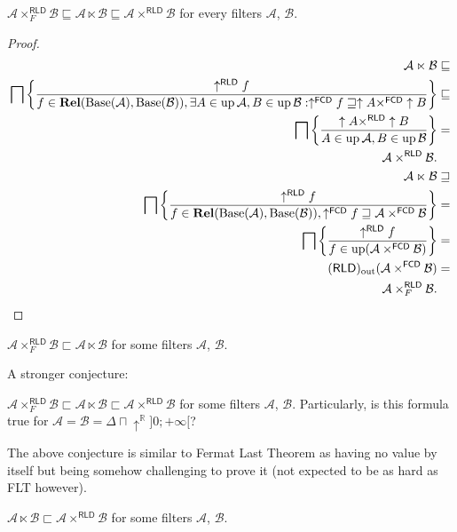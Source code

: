 \begin{prop}
$\mathcal{A}\times_{F}^{\mathsf{RLD}}\mathcal{B}\sqsubseteq\mathcal{A}\ltimes\mathcal{B}\sqsubseteq\mathcal{A}\times^{\mathsf{RLD}}\mathcal{B}$
for every filters $\mathcal{A}$, $\mathcal{B}$.\end{prop}
\begin{proof}
~
\begin{align*}
\mathcal{A}\ltimes\mathcal{B} & \sqsubseteq\\
\bigsqcap\left\{ \frac{\uparrow^{\mathsf{RLD}}f}{f\in\mathbf{Rel}(\operatorname{Base}(\mathcal{A}),\operatorname{Base}(\mathcal{B})),\exists A\in\operatorname{up}\mathcal{A},B\in\operatorname{up}\mathcal{B}:\uparrow^{\mathsf{FCD}}f\sqsupseteq\uparrow A\times^{\mathsf{FCD}}\uparrow B}\right\} & \sqsubseteq\\
\bigsqcap\left\{ \frac{\uparrow A\times^{\mathsf{RLD}}\uparrow B}{A\in\operatorname{up}\mathcal{A},B\in\operatorname{up}\mathcal{B}}\right\} & =\\
\mathcal{A}\times^{\mathsf{RLD}}\mathcal{B}.\\
\mathcal{A}\ltimes\mathcal{B} & \sqsupseteq\\
\bigsqcap\left\{ \frac{\uparrow^{\mathsf{RLD}}f}{f\in\mathbf{Rel}(\operatorname{Base}(\mathcal{A}),\operatorname{Base}(\mathcal{B})),\uparrow^{\mathsf{FCD}}f\sqsupseteq\mathcal{A}\times^{\mathsf{FCD}}\mathcal{B}}\right\} & =\\
\bigsqcap\left\{ \frac{\uparrow^{\mathsf{RLD}}f}{f\in\operatorname{up}(\mathcal{A}\times^{\mathsf{FCD}}\mathcal{B})}\right\} & =\\
(\mathsf{RLD})_{\mathrm{out}}(\mathcal{A}\times^{\mathsf{FCD}}\mathcal{B}) & =\\
\mathcal{A}\times_{F}^{\mathsf{RLD}}\mathcal{B}.
\end{align*}
\end{proof}
\begin{conjecture}
$\mathcal{A}\times_{F}^{\mathsf{RLD}}\mathcal{B}\sqsubset\mathcal{A}\ltimes\mathcal{B}$
for some filters $\mathcal{A}$, $\mathcal{B}$.
\end{conjecture}
A stronger conjecture:
\begin{conjecture}
$\mathcal{A}\times_{F}^{\mathsf{RLD}}\mathcal{B}\sqsubset\mathcal{A}\ltimes\mathcal{B}\sqsubset\mathcal{A}\times^{\mathsf{RLD}}\mathcal{B}$
for some filters $\mathcal{A}$, $\mathcal{B}$. Particularly, is
this formula true for $\mathcal{A}=\mathcal{B}=\Delta\sqcap\uparrow^{\mathbb{R}}]0;+\infty[$?
\end{conjecture}
The above conjecture is similar to Fermat Last Theorem as having no
value by itself but being somehow challenging to prove it (not expected
to be as hard as FLT however).
\begin{example}
$\mathcal{A}\ltimes\mathcal{B}\sqsubset\mathcal{A}\times^{\mathsf{RLD}}\mathcal{B}$
for some filters $\mathcal{A}$, $\mathcal{B}$.\end{example}

